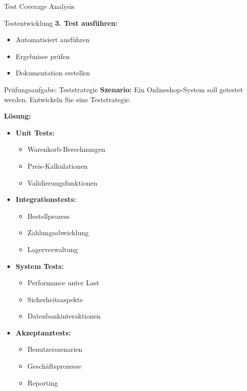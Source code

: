\begin{example2}{Test Coverage Analysis}
\begin{KR}{Testentwicklung}
\textbf{3. Test ausführen:}
\begin{itemize}
    \item Automatisiert ausführen
    \item Ergebnisse prüfen
    \item Dokumentation erstellen
\end{itemize}
\end{KR}

\begin{example2}{Prüfungsaufgabe: Teststrategie}
\textbf{Szenario:}
Ein Onlineshop-System soll getestet werden. Entwickeln Sie eine Teststrategie.

\textbf{Lösung:}
\begin{itemize}
    \item \textbf{Unit Tests:}
    \begin{itemize}
        \item Warenkorb-Berechnungen
        \item Preis-Kalkulationen
        \item Validierungsfunktionen
    \end{itemize}
    
    \item \textbf{Integrationstests:}
    \begin{itemize}
        \item Bestellprozess
        \item Zahlungsabwicklung
        \item Lagerverwaltung
    \end{itemize}
    
    \item \textbf{System Tests:}
    \begin{itemize}
        \item Performance unter Last
        \item Sicherheitsaspekte
        \item Datenbankinteraktionen
    \end{itemize}
    
    \item \textbf{Akzeptanztests:}
    \begin{itemize}
        \item Benutzerszenarien
        \item Geschäftsprozesse
        \item Reporting
    \end{itemize}
\end{itemize}
\end{example2}


\end{example2}
